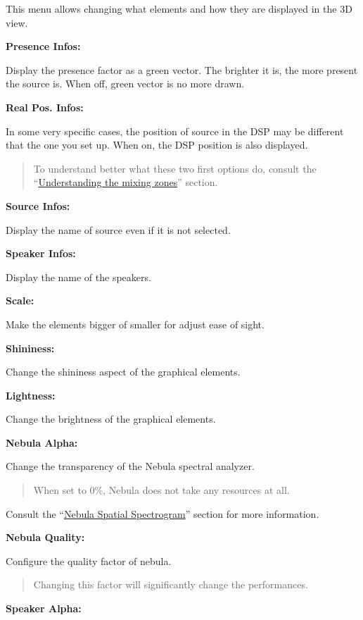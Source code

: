 \documentclass[
  letterpaper,
  DIV=11,
  numbers=noendperiod]{scrreport}
\begin{document}
This menu allows changing what elements and how they are displayed in
the 3D view.

\textbf{Presence Infos:}

Display the presence factor as a green vector. The brighter it is, the
more present the source is. When off, green vector is no more drawn.

\textbf{Real Pos. Infos:}

In some very specific cases, the position of source in the DSP may be
different that the one you set up. When on, the DSP position is also
displayed.

\begin{quote}
To understand better what these two first options do, consult the
``\href{Spat_Environment_Understanding_the_3D_View.md}{Understanding the
mixing zones}'' section.
\end{quote}

\textbf{Source Infos:}

Display the name of source even if it is not selected.

\textbf{Speaker Infos:}

Display the name of the speakers.

\textbf{Scale:}

Make the elements bigger of smaller for adjust ease of sight.

\textbf{Shininess:}

Change the shininess aspect of the graphical elements.

\textbf{Lightness:}

Change the brightness of the graphical elements.

\textbf{Nebula Alpha:}

Change the transparency of the Nebula spectral analyzer.

\begin{quote}
When set to 0\%, Nebula does not take any resources at all.
\end{quote}

Consult the ``\href{Spat_Environment_Nebula.md}{Nebula Spatial
Spectrogram}'' section for more information.

\textbf{Nebula Quality:}

Configure the quality factor of nebula.

\begin{quote}
Changing this factor will significantly change the performances.
\end{quote}

\textbf{Speaker Alpha:}
\end{document}
